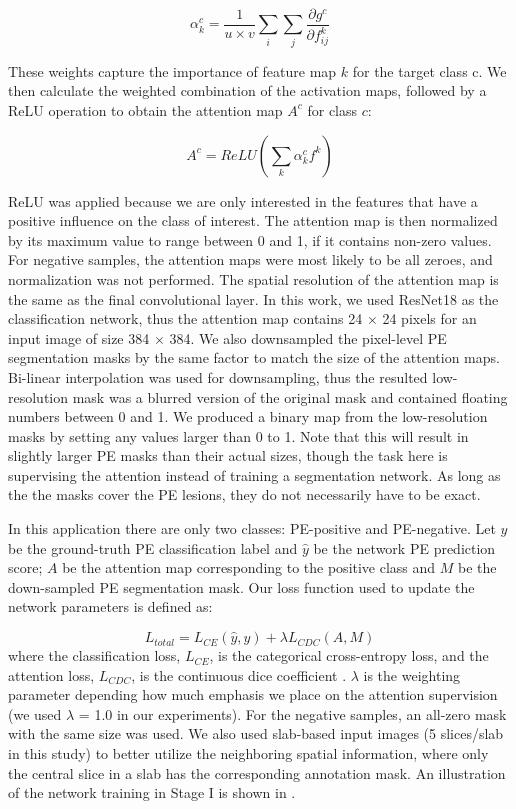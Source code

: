 \documentclass{midl} %
\begin{document}
\begin{equation}
\alpha ^{c}_{k}=\frac{1}{u \times v} \displaystyle\sum_{i} \displaystyle\sum_{j} \frac{\partial g^{c}}{\partial f^{k}_{ij}}
\end{equation}

These weights capture the importance of feature map $k$ for the target class c. We then calculate the weighted combination of the activation maps, followed by a ReLU operation to obtain the attention map $A^{c}$ for class $c$:

\begin{equation}
A^{c} = ReLU(\displaystyle\sum_{k} \alpha ^{c}_{k} f^{k})
\end{equation}

ReLU was applied because we are only interested in the features that have a positive influence on the class of interest. The attention map is then normalized by its maximum value to range between 0 and 1, if it contains non-zero values. For negative samples, the attention maps were most likely to be all zeroes, and normalization was not performed. The spatial resolution of the attention map is the same as the final convolutional layer. In this work, we used ResNet18 \cite{he2016deep} as the classification network, thus the attention map contains 24 $\times$ 24 pixels for an input image of size 384 $\times$ 384. We also downsampled the pixel-level PE segmentation masks by the same factor to match the size of the attention maps. Bi-linear interpolation was used for downsampling, thus the resulted low-resolution mask was a blurred version of the original mask and contained floating numbers between 0 and 1. We produced a binary map from the low-resolution masks by setting any values larger than 0 to 1. Note that this will result in slightly larger PE masks than their actual sizes, though the task here is supervising the attention instead of training a segmentation network. As long as the the masks cover the PE lesions, they do not necessarily have to be exact. 

In this application there are only two classes: PE-positive and PE-negative. Let $y$ be the ground-truth PE classification label and $\hat{y}$ be the network PE prediction score; $A$ be the attention map corresponding to the positive class and $M$ be the down-sampled PE segmentation mask. Our loss function used to update the network parameters is defined as:

\begin{equation}
L_{total}=L_{CE}(\hat{y}, y)+\lambda L_{CDC}(A, M)
\label{eq:loss}
\end{equation}
where the classification loss, $L_{CE}$, is the categorical cross-entropy loss, and the attention loss, $L_{CDC}$, is the continuous dice coefficient \cite{shamir2019continuous}. $\lambda$ is the weighting parameter depending how much emphasis we place on the attention supervision (we used $\lambda$ = 1.0 in our experiments). For the negative samples, an all-zero mask with the same size was used. We also used slab-based input images (5 slices/slab in this study) to better utilize the neighboring spatial information, where only the central slice in a slab has the corresponding annotation mask. An illustration of the network training in Stage I is shown in .
\end{document}
